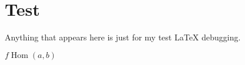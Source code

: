 \section{Test}
Anything that appears here is just for my test LaTeX debugging.

$f \operatorname{Hom}(a, b)$